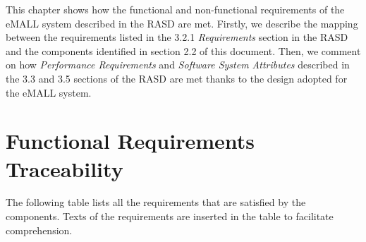 This chapter shows how the functional and non-functional requirements of the eMALL system described in the RASD are met.
Firstly, we describe the mapping between the requirements listed in the 3.2.1 \textit{Requirements} section in the RASD
and the components identified in section 2.2 of this document.
Then, we comment on how \textit{Performance Requirements} and \textit{Software System Attributes} described in the 3.3
and 3.5 sections of the RASD are met thanks to the design adopted for the eMALL system.


\section{Functional Requirements Traceability}
\label{sec: functional_requirements_traceability}%
The following table lists all the requirements that are satisfied by the components.
Texts of the requirements are inserted in the table to facilitate comprehension.
